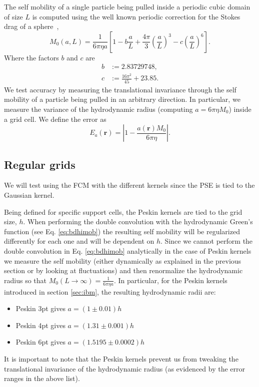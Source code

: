 \documentclass[twoside,openright,titlepage,numbers=noenddot,%
headinclude,footinclude,cleardoublepage=empty,abstract=on,
BCOR=5mm,fontsize=11pt, dvipsnames, paper=b5
]{scrreprt}
\renewcommand{\vec}[1]{\bm{#1}}
\begin{document}
The self mobility of a single particle being pulled inside a periodic cubic domain of size $L$ is computed using the well known periodic correction for the Stokes drag of a sphere~\cite{Hasimoto1959},
\begin{equation}
  \label{eq:selfmobpbc}
  M_{0}(a,L) = \frac{1}{6\pi\eta a}\left[1-b\frac{a}{L} + \frac{4\pi}{3}\left(\frac{a}{L}\right)^3 - c \left(\frac{a}{L}\right)^6\right].
\end{equation}
Where the factors $b$ and $c$ are
\begin{equation}
  \begin{aligned}
  b &:= 2.83729748,\\
  c &:= \frac{16\pi^2}{45} + 23.85.
  \end{aligned}
\end{equation}
We test accuracy by measuring the translational invariance through the self mobility of a particle being pulled in an arbitrary direction. In particular, we measure the variance of the hydrodynamic radius (computing $a = 6\pi\eta M_{0}$) inside a grid cell.
We define the error as
\begin{equation}
  \label{hydroerr}
  E_a(\vec{r}) = \left|1 - \frac{a(\vec{r})M_{0}}{6\pi\eta}\right|.
\end{equation}


\subsection*{Regular grids}
We will test using the \gls{FCM} with the different kernels since the \gls{PSE} is tied to the Gaussian kernel.

Being defined for specific support cells, the Peskin kernels are tied to the grid size, $h$. When performing the double convolution with the hydrodynamic Green's function (see Eq. \eqref{eq:bdhimob}) the resulting self mobility will be regularized differently for each one and will be dependent on $h$.
Since we cannot perform the double convolution in Eq. \eqref{eq:bdhimob} analytically in the case of Peskin kernels we measure the self mobility (either dynamically as explained in the previous section or by looking at fluctuations) and then renormalize the hydrodynamic radius so that $M_{0}(L\rightarrow\infty) = \frac{1}{6\pi\eta a}$.
In particular, for the Peskin kernels introduced in section \ref{sec:ibm}, the resulting hydrodynamic radii are:
\begin{itemize}
\item Peskin 3pt gives $a=(1\pm 0.01) h$
\item Peskin 4pt gives $a=(1.31\pm 0.001) h$
\item Peskin 6pt gives $a=(1.5195 \pm 0.0002) h$
\end{itemize}
It is important to note that the Peskin kernels prevent us from tweaking the translational invariance of the hydrodynamic radius (as evidenced by the error ranges in the above list).
\end{document}
